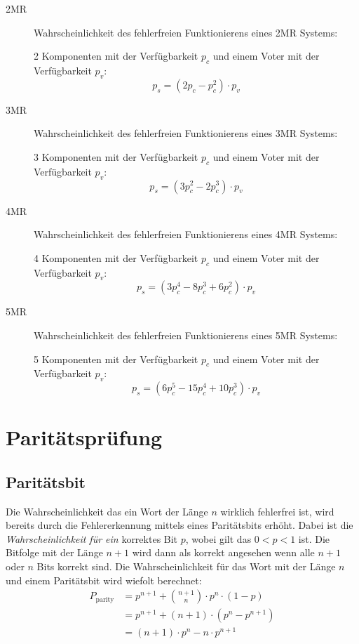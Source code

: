 \documentclass
[
	8pt,		%
	ngerman,	%
	a4paper,	%
	landscape,	%
	final		%
]{extarticle}
\begin{document}
\begin{multicols*}{4}
\begin{description}
	\item[2MR]
	      Wahrscheinlichkeit des fehlerfreien Funktionierens eines 2MR Systems:\par
	      2 Komponenten mit der Verfügbarkeit $p_{c}$ und einem Voter mit der Verfügbarkeit $p_{v}$:
	      \[p_{s} = \left(2 p_{c} - p_{c}^{2} \right) \cdot p_{v}\]
	\item[3MR]
	      Wahrscheinlichkeit des fehlerfreien Funktionierens eines 3MR Systems:\par
	      3 Komponenten mit der Verfügbarkeit $p_{c}$ und einem Voter mit der Verfügbarkeit $p_{v}$:
	      \[p_{s} = \left(3 p_{c}^{2} - 2 p_{c}^{3} \right) \cdot p_{v}\]
	\item[4MR]
	      Wahrscheinlichkeit des fehlerfreien Funktionierens eines 4MR Systems:\par
	      4 Komponenten mit der Verfügbarkeit $p_{c}$ und einem Voter mit der Verfügbarkeit $p_{v}$:
	      \[p_{s} = \left(3 p_{c}^{4} - 8 p_{c}^{3} + 6 p_{c}^{2} \right) \cdot p_{v}\]
	\item[5MR]
	      Wahrscheinlichkeit des fehlerfreien Funktionierens eines 5MR Systems:\par
	      5 Komponenten mit der Verfügbarkeit $p_{c}$ und einem Voter mit der Verfügbarkeit $p_{v}$:
	      \[p_{s} = \left(6 p_{c}^{5} - 15 p_{c}^{4} + 10 p_{c}^{3} \right) \cdot p_{v}\]
\end{description}

\section{Paritätsprüfung}
\subsection{Paritätsbit}
Die Wahrscheinlichkeit das ein Wort der Länge $n$ wirklich fehlerfrei ist, wird bereits
durch die Fehlererkennung mittels eines Paritätsbits erhöht. Dabei ist die
\emph{Wahrscheinlichkeit für ein} korrektes Bit $p$, wobei gilt das $0<p<1$ ist.
Die Bitfolge mit der Länge $n+1$ wird dann als korrekt angesehen wenn alle $n+1$ oder
$n$ Bits korrekt sind. Die Wahrscheinlichkeit für das Wort mit der Länge $n$ und einem
Paritätsbit wird wiefolt berechnet:
\begin{align*}
	P_{\text{parity}} & = p^{n+1}+\binom{n+1}{n}\cdot p^{n}\cdot\left(1-p\right)  \\
	                  & = p^{n+1}+\left(n+1\right)\cdot\left(p^{n}-p^{n+1}\right) \\
	                  & = \left(n+1\right)\cdot p^{n}-n\cdot p^{n + 1}
\end{align*}


\end{multicols*}
\end{document}
